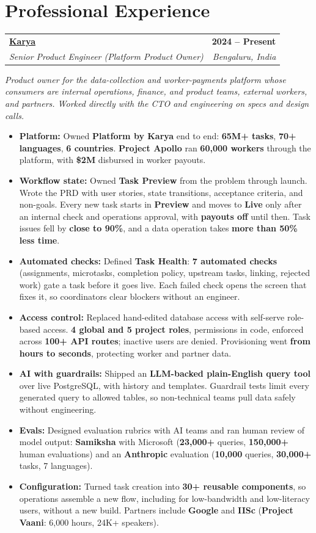 \documentclass[letterpaper,10.5pt]{article}
\makeatletter
\newcommand{\entry}[4]{%
  \begin{tabularx}{\linewidth}{@{}X@{}r@{}}
    \textbf{#1} & \textbf{#4} \\
    \textit{#2} & \textit{#3} \\
  \end{tabularx}%
  \vspace{1pt}
}
\makeatother
\begin{document}
\section{Professional Experience}

\entry{\href{https://karya.in}{Karya}}{Senior Product Engineer (Platform Product Owner)}{Bengaluru, India}{2024 -- Present}
{\small\textit{Product owner for the data-collection and worker-payments platform whose consumers are internal operations, finance, and product teams, external workers, and partners. Worked directly with the CTO and engineering on specs and design calls.}}
\begin{itemize}
  \item \textbf{Platform:} Owned \textbf{Platform by Karya} end to end: \textbf{65M+ tasks}, \textbf{70+ languages}, \textbf{6 countries}. \textbf{Project Apollo} ran \textbf{60,000 workers} through the platform, with \textbf{\$2M} disbursed in worker payouts.
  \item \textbf{Workflow state:} Owned \textbf{Task Preview} from the problem through launch. Wrote the PRD with user stories, state transitions, acceptance criteria, and non-goals. Every new task starts in \textbf{Preview} and moves to \textbf{Live} only after an internal check and operations approval, with \textbf{payouts off} until then. Task issues fell by \textbf{close to 90\%}, and a data operation takes \textbf{more than 50\% less time}.
  \item \textbf{Automated checks:} Defined \textbf{Task Health}: \textbf{7 automated checks} (assignments, microtasks, completion policy, upstream tasks, linking, rejected work) gate a task before it goes live. Each failed check opens the screen that fixes it, so coordinators clear blockers without an engineer.
  \item \textbf{Access control:} Replaced hand-edited database access with self-serve role-based access. \textbf{4 global and 5 project roles}, permissions in code, enforced across \textbf{100+ API routes}; inactive users are denied. Provisioning went \textbf{from hours to seconds}, protecting worker and partner data.
  \item \textbf{AI with guardrails:} Shipped an \textbf{LLM-backed plain-English query tool} over live PostgreSQL, with history and templates. Guardrail tests limit every generated query to allowed tables, so non-technical teams pull data safely without engineering.
  \item \textbf{Evals:} Designed evaluation rubrics with AI teams and ran human review of model output: \textbf{Samiksha} with Microsoft (\textbf{23,000+} queries, \textbf{150,000+} human evaluations) and an \textbf{Anthropic} evaluation (\textbf{10,000} queries, \textbf{30,000+} tasks, 7 languages).
  \item \textbf{Configuration:} Turned task creation into \textbf{30+ reusable components}, so operations assemble a new flow, including for low-bandwidth and low-literacy users, without a new build. Partners include \textbf{Google} and \textbf{IISc} (\textbf{Project Vaani}: 6,000 hours, 24K+ speakers).
\end{itemize}
\end{document}
